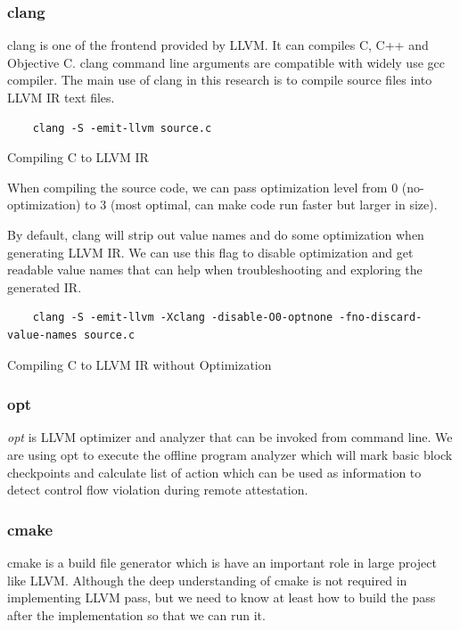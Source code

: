 \subsubsection{clang}

clang is one of the frontend provided by LLVM. It can compiles C, C++ and Objective C. clang command line arguments are compatible with widely use gcc compiler. The main use of clang in this research is to compile source files into LLVM IR text files.

\begin{listing}
\begin{verbatim}
    clang -S -emit-llvm source.c
\end{verbatim}
\caption{Compiling C to LLVM IR}    
\label{listing:2-7}
\end{listing}
    
When compiling the source code, we can pass optimization level from 0 (no-optimization) to 3 (most optimal, can make code run faster but larger in size).  

By default, clang will strip out value names and do some optimization when generating LLVM IR. We can use this flag to disable optimization and get readable value names that can help when troubleshooting and exploring the generated IR.

\begin{listing}
\begin{verbatim}
    clang -S -emit-llvm -Xclang -disable-O0-optnone -fno-discard-value-names source.c
\end{verbatim}
\caption{Compiling C to LLVM IR without Optimization}    
\label{listing:2-8}
\end{listing}

\subsubsection{opt}

\emph{opt} is LLVM optimizer and analyzer that can be invoked from command line. We are using opt to execute the offline program analyzer which will mark basic block checkpoints and calculate list of action which can be used as information to detect control flow violation during remote attestation.

\subsubsection{cmake}

cmake is a build file generator which is have an important role in large project like LLVM. Although the deep understanding of cmake is not required in implementing LLVM pass, but we need to know at least how to build the pass after the implementation so that we can run it.

